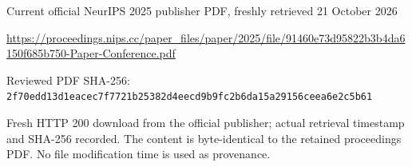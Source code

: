 \documentclass[11pt]{article}
\begin{document}
Current official NeurIPS 2025 publisher PDF, freshly retrieved 21 October 2026

\url{https://proceedings.nips.cc/paper_files/paper/2025/file/91460e73d95822b3b4da6150f685b750-Paper-Conference.pdf}

Reviewed PDF SHA-256: \nolinkurl{2f70edd13d1eacec7f7721b25382d4eecd9b9fc2b6da15a29156ceea6e2c5b61}

Fresh HTTP 200 download from the official publisher; actual retrieval timestamp and SHA-256 recorded. The content is byte-identical to the retained proceedings PDF. No file modification time is used as provenance.
\end{document}
